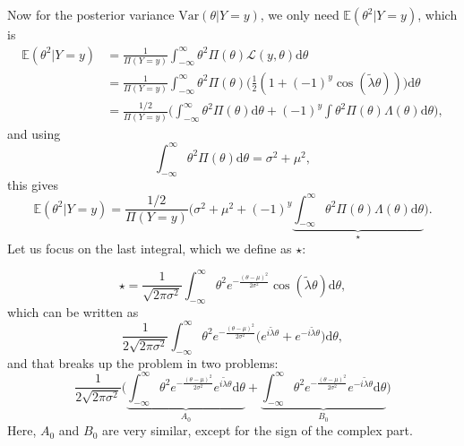 \documentclass[]{report}
\begin{document}
Now for the posterior variance $\text{Var}(\theta|Y=y)$, we only need $\mathbb{E}(\theta^2 | Y=y)$, which is
\begin{align}
   \mathbb{E}(\theta^2 | Y=y) &= \frac{1}{\Pi(Y=y)} \int_{-\infty}^{\infty} \theta^2 \Pi(\theta)\mathcal{L}(y, \theta)\text{d}\theta\\
   &= \frac{1}{\Pi(Y=y)} \int_{-\infty}^{\infty} \theta^2 \Pi(\theta)\Big(\frac{1}{2}(1 + (-1)^{y} \cos(\tilde{\lambda} \theta))\Big)\text{d}\theta\\
   &= \frac{1/2}{\Pi(Y=y)} \Bigg(\int_{-\infty}^{\infty}\theta^2\Pi(\theta)\text{d}\theta + (-1)^y \int\theta^2\Pi(\theta)\Lambda(\theta)\text{d}\theta\Bigg),
\end{align}
and using
\begin{equation}
   \int_{-\infty}^{\infty}\theta^2\Pi(\theta)\text{d}\theta = \sigma^2 + \mu^2,
\end{equation}
this gives
\begin{equation}
\label{eq:second-moment}
    \mathbb{E}(\theta^2 | Y=y) = \frac{1/2}{\Pi(Y=y)} \Bigg(\sigma^2 + \mu^2+ (-1)^y \underbrace{\int_{-\infty}^{\infty}\theta^2\Pi(\theta)\Lambda(\theta)\text{d}\theta}_{\star}\Bigg).
\end{equation}
Let us focus on the last integral, which we define as $\star$:

\begin{equation}
    \star = \frac{1}{\sqrt{2\pi \sigma^2}}\int_{-\infty}^{\infty}\theta^2e^{-\frac{(\theta-\mu)^2}{2\sigma^2}}\cos(\tilde{\lambda}\theta)\text{d}\theta,
\end{equation}
which can be written as
\begin{equation}
    \frac{1}{2\sqrt{2\pi \sigma^2}}\int_{-\infty}^{\infty}\theta^2e^{-\frac{(\theta-\mu)^2}{2\sigma^2}} \Big( e^{i\tilde{\lambda}\theta} + e^{-i\tilde{\lambda}\theta} \Big) \text{d}\theta,
\end{equation}
and that breaks up the problem in two problems:
\begin{equation}
    \frac{1}{2\sqrt{2\pi \sigma^2}} \Big(
        \underbrace{\int_{-\infty}^{\infty}\theta^2e^{-\frac{(\theta-\mu)^2}{2\sigma^2}} e^{i\tilde{\lambda}\theta}\text{d}\theta}_{A_0} +
        \underbrace{\int_{-\infty}^{\infty}\theta^2e^{-\frac{(\theta-\mu)^2}{2\sigma^2}}e^{-i\tilde{\lambda}\theta}\text{d}\theta}_{B_0}
    \Big)
\end{equation}
Here, $A_0$ and $B_0$ are very similar, except for the sign of the complex part.
\end{document}

